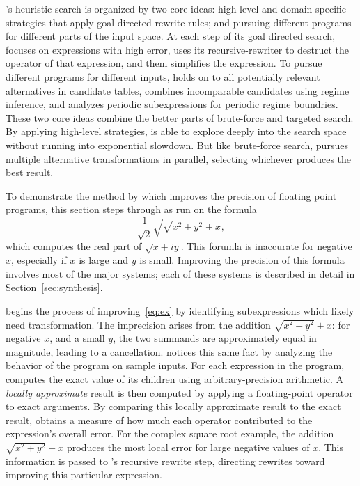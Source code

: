 \documentclass[paper.tex]{subfiles}
\begin{document}
\casio's heuristic search is organized by two core ideas: high-level
and domain-specific strategies that apply goal-directed rewrite rules;
and pursuing different programs for different parts of the input
space.  At each step of its goal directed search, \casio focuses on
expressions with high error, uses its recursive-rewriter to destruct
the operator of that expression, and them simplifies the expression.
To pursue different programs for different inputs, \casio holds on to
all potentially relevant alternatives in candidate tables, combines
incomparable candidates using regime inference, and analyzes periodic
subexpressions for periodic regime boundries.  These two core ideas
combine the better parts of brute-force and targeted search.  By
applying high-level strategies, \casio is able to explore deeply into
the search space without running into exponential slowdown.  But like
brute-force search, \casio pursues multiple alternative
transformations in parallel, selecting whichever produces the best
result.

To demonstrate the method by which
  \casio improves the precision of floating point programs,
  this section steps through \casio as run on the formula
\begin{equation}\label{eq:ex}
  \frac1{\sqrt2} \sqrt{\sqrt{x^2 + y^2} + x},
\end{equation}
  which computes the real part of $\sqrt{x + i y}$.
This forumla is inaccurate for negative $x$,
  especially if $x$ is large and $y$ is small.
Improving the precision of this formula
  involves most of the major systems;
  each of these systems is described in detail
  in Section~\ref{sec:synthesis}.

\casio begins the process of improving~\eqref{eq:ex}
  by identifying subexpressions
  which likely need transformation.
The imprecision arises from the addition $\sqrt{x^2 + y^2} + x$:
  for negative $x$, and a small $y$,
  the two summands are approximately equal in magnitude,
  leading to a cancellation.
\casio notices this same fact
  by analyzing the behavior of the program on sample inputs.
For each expression in the program,
  \casio computes the exact value of its children
  using arbitrary-precision arithmetic.
A \emph{locally approximate} result is then computed
  by applying a floating-point operator to exact arguments.
By comparing this locally approximate result to the exact result,
  \casio obtains a measure of how much each operator
  contributed to the expression's overall error.
For the complex square root example,
  the addition $\sqrt{x^2 + y^2} + x$ produces the most local error
  for large negative values of $x$.
This information is passed to \casio's recursive rewrite step,
  directing rewrites toward improving this particular expression.
\end{document}
